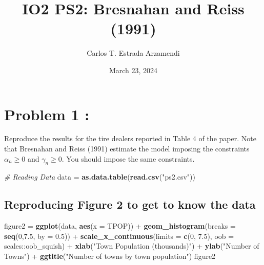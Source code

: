 \documentclass[]{article}
\title{IO2 PS2: Bresnahan and Reiss (1991)}
\author{Carlos T. Estrada Arzamendi}
\date{March 23, 2024}
\newenvironment{Shaded}{\begin{snugshade}}{\end{snugshade}}
\newcommand{\KeywordTok}[1]{\textcolor[rgb]{0.13,0.29,0.53}{\textbf{{#1}}}}
\newcommand{\DataTypeTok}[1]{\textcolor[rgb]{0.13,0.29,0.53}{{#1}}}
\newcommand{\DecValTok}[1]{\textcolor[rgb]{0.00,0.00,0.81}{{#1}}}
\newcommand{\FloatTok}[1]{\textcolor[rgb]{0.00,0.00,0.81}{{#1}}}
\newcommand{\StringTok}[1]{\textcolor[rgb]{0.31,0.60,0.02}{{#1}}}
\newcommand{\CommentTok}[1]{\textcolor[rgb]{0.56,0.35,0.01}{\textit{{#1}}}}
\newcommand{\NormalTok}[1]{{#1}}
\begin{document}
\maketitle

\section{Problem 1 :}\label{problem-1}

Reproduce the results for the tire dealers reported in Table 4 of the
paper. Note that Bresnahan and Reiss (1991) estimate the model imposing
the constraints \(\alpha_n \geq 0\) and \(\gamma_n \geq 0\). You should
impose the same constraints.

\begin{Shaded}
\begin{Highlighting}[]
\CommentTok{# Reading Data}
\NormalTok{data =}\StringTok{ }\KeywordTok{as.data.table}\NormalTok{(}\KeywordTok{read.csv}\NormalTok{(}\StringTok{"ps2.csv"}\NormalTok{))}
\end{Highlighting}
\end{Shaded}

\subsection{Reproducing Figure 2 to get to know the
data}\label{reproducing-figure-2-to-get-to-know-the-data}

\begin{Shaded}
\begin{Highlighting}[]
\NormalTok{figure2 =}\StringTok{ }\KeywordTok{ggplot}\NormalTok{(data, }\KeywordTok{aes}\NormalTok{(}\DataTypeTok{x =} \NormalTok{TPOP)) +}\StringTok{ }\KeywordTok{geom_histogram}\NormalTok{(}\DataTypeTok{breaks =} \KeywordTok{seq}\NormalTok{(}\DecValTok{0}\NormalTok{,}\FloatTok{7.5}\NormalTok{, }\DataTypeTok{by =} \FloatTok{0.5}\NormalTok{)) +}
\StringTok{              }\KeywordTok{scale_x_continuous}\NormalTok{(}\DataTypeTok{limits =} \KeywordTok{c}\NormalTok{(}\DecValTok{0}\NormalTok{, }\FloatTok{7.5}\NormalTok{),}
                     \DataTypeTok{oob =} \NormalTok{scales::oob_squish) +}
\StringTok{            }\KeywordTok{xlab}\NormalTok{(}\StringTok{"Town Population (thousands)"}\NormalTok{) +}
\StringTok{            }\KeywordTok{ylab}\NormalTok{(}\StringTok{"Number of Towns"}\NormalTok{) +}
\StringTok{            }\KeywordTok{ggtitle}\NormalTok{(}\StringTok{"Number of towns by town population"}\NormalTok{)}
\NormalTok{figure2}
\end{Highlighting}
\end{Shaded}
\end{document}
